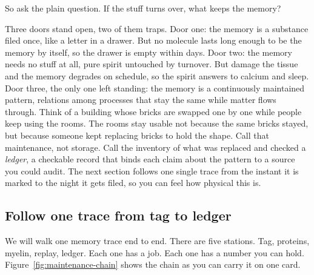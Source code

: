 So ask the plain question. If the stuff turns over, what keeps the memory?

Three doors stand open, two of them traps. Door one: the memory is a substance filed once, like a letter in a drawer. But no molecule lasts long enough to be the memory by itself, so the drawer is empty within days. Door two: the memory needs no stuff at all, pure spirit untouched by turnover. But damage the tissue and the memory degrades on schedule, so the spirit answers to calcium and sleep. Door three, the only one left standing: the memory is a continuously maintained pattern, relations among processes that stay the same while matter flows through. Think of a building whose bricks are swapped one by one while people keep using the rooms. The rooms stay usable not because the same bricks stayed, but because someone kept replacing bricks to hold the shape. Call that maintenance, not storage. Call the inventory of what was replaced and checked a \textit{ledger}, a checkable record that binds each claim about the pattern to a source you could audit. The next section follows one single trace from the instant it is marked to the night it gets filed, so you can feel how physical this is.

\subsection*{Follow one trace from tag to ledger}

We will walk one memory trace end to end. There are five stations. Tag, proteins, myelin, replay, ledger. Each one has a job. Each one has a number you can hold. Figure~\ref{fig:maintenance-chain} shows the chain as you can carry it on one card.

